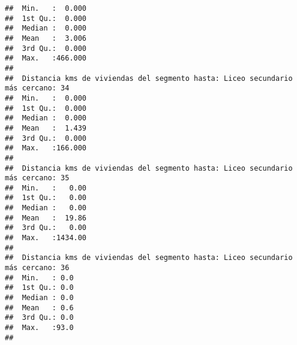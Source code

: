 \documentclass[11pt,]{article}
\begin{document}
\begin{verbatim}
##  Min.   :  0.000                                                                
##  1st Qu.:  0.000                                                                
##  Median :  0.000                                                                
##  Mean   :  3.006                                                                
##  3rd Qu.:  0.000                                                                
##  Max.   :466.000                                                                
##                                                                                 
##  Distancia kms de viviendas del segmento hasta: Liceo secundario más cercano: 34
##  Min.   :  0.000                                                                
##  1st Qu.:  0.000                                                                
##  Median :  0.000                                                                
##  Mean   :  1.439                                                                
##  3rd Qu.:  0.000                                                                
##  Max.   :166.000                                                                
##                                                                                 
##  Distancia kms de viviendas del segmento hasta: Liceo secundario más cercano: 35
##  Min.   :   0.00                                                                
##  1st Qu.:   0.00                                                                
##  Median :   0.00                                                                
##  Mean   :  19.86                                                                
##  3rd Qu.:   0.00                                                                
##  Max.   :1434.00                                                                
##                                                                                 
##  Distancia kms de viviendas del segmento hasta: Liceo secundario más cercano: 36
##  Min.   : 0.0                                                                   
##  1st Qu.: 0.0                                                                   
##  Median : 0.0                                                                   
##  Mean   : 0.6                                                                   
##  3rd Qu.: 0.0                                                                   
##  Max.   :93.0                                                                   
##                                                                                 

\end{verbatim}
\end{document}
